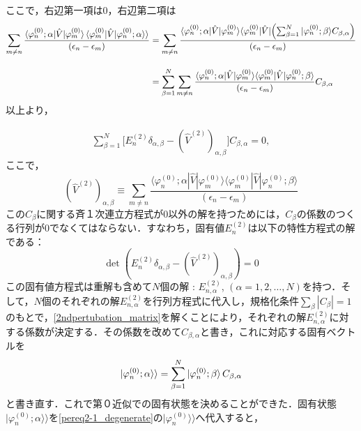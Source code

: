 ここで，右辺第一項は0，右辺第二項は
\begin{align}
    \sum_{m\neq n}
    \frac{\langle{\varphi^{(0)}_n;\alpha|\hat{V}|\varphi^{(0)}_m}\rangle
    \braket{\varphi^{(0)}_{m}|\hat{V}|\varphi^{(0)}_n;\alpha}\rangle}{(\epsilon_n-\epsilon_m)}
    &= \sum_{m\neq n}
    \frac{\langle{\varphi^{(0)}_n;\alpha|\hat{V}|\varphi^{(0)}_m}\rangle
    \langle{\varphi^{(0)}_{m}|\hat{V}|\Bigl(\sum_{\beta=1}^{N}|\varphi^{(0)}_n;\beta}\rangle C_{\beta,\alpha}\Bigr)}
    {(\epsilon_n-\epsilon_m)}\nn[10pt]
    &=\sum_{\beta=1}^{N} \sum_{m\neq n}
    \frac{\langle{\varphi^{(0)}_n;\alpha|\hat{V}|\varphi^{(0)}_m}\rangle
    \langle{\varphi^{(0)}_{m}|\hat{V}|\varphi^{(0)}_n;\beta}\rangle}
    {(\epsilon_n-\epsilon_m)}C_{\beta,\alpha}
\end{align}
以上より，

\begin{align}\label{2ndpertubation_matrix}
\sum_{\beta=1}^{N}\Biggl[
E^{(2)}_n \delta_{\alpha,\beta}
-(\hat{V}^{(2)})_{\alpha,\beta}
\biggr]C_{\beta,\alpha}=0,
\end{align}
ここで，
\begin{equation}
    (\hat{V}^{(2)})_{\alpha,\beta}
    \equiv\sum_{m\neq n}
    \frac{\langle{\varphi^{(0)}_n;\alpha|\hat{V}|\varphi^{(0)}_m}\rangle
    \langle{\varphi^{(0)}_{m}|\hat{V}|\varphi^{(0)}_n;\beta}\rangle}
    {(\epsilon_n-\epsilon_m)}
\end{equation}
この$C_{\beta}$に関する斉１次連立方程式が0以外の解を持つためには，$C_{\beta}$の係数のつくる行列が0でなくてはならない．すなわち，固有値$E^{(2)}_{n}$は以下の特性方程式の解である：
\begin{equation}\label{2nd_eigen_eq}
    \det{(E^{(2)}_n \delta_{\alpha,\beta}
    -(\hat{V}^{(2)})_{\alpha,\beta})}=0
\end{equation}
この固有値方程式は重解も含めて$N$個の解 : $E^{(2)}_{n,\alpha}$, $(\alpha=1,2,\ldots,N)$を持つ．そして，$N$個のそれぞれの解$E^{(2)}_{n,\alpha}$を行列方程式に代入し，規格化条件$\sum_{\beta}|C_{\beta}|=1$のもとで，\eqref{2ndpertubation_matrix}を解くことにより，それぞれの解$E^{(2)}_{n,\alpha}$に対する係数が決定する．その係数を改めて$C_{\beta,\alpha}$と書き，これに対応する固有ベクトルを
\begin{equation}
    |\varphi^{(0)}_{n};\alpha\rangle\rangle
    =\sum_{\beta=1}^{N}
    \ket{\varphi^{(0)}_{n};\beta}C_{\beta,\alpha}
\end{equation}
と書き直す．これで第０近似での固有状態を決めることができた．固有状態$|\varphi^{(0)}_{n};\alpha\rangle\rangle$を\eqref{pereq2-1_degenerate}の$|\varphi^{(0)}_{n}\rangle\rangle$へ代入すると，
